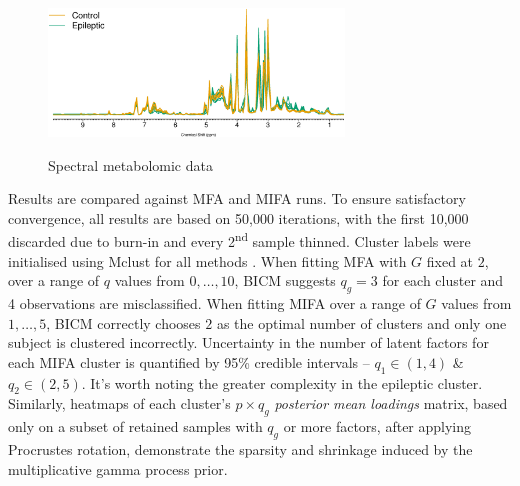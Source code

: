 \documentclass[a4paper,12pt,fleqn]{article}
\numberwithin{equation}{section}
\begin{document}
\begin{figure}[h]
	\centering
	\caption{Spectral metabolomic data}
	\includegraphics[width=0.7\textwidth, keepaspectratio]{Urine_Data.eps}
	\label{RatData}
\end{figure}

Results are compared against MFA and MIFA runs. To ensure satisfactory convergence, all results are based on 50,000 iterations, with the first 10,000 discarded due to burn-in and every 2\textsuperscript{nd} sample thinned. Cluster labels were initialised using Mclust for all methods \citep{Mclust}. When fitting MFA with $G$ fixed at $2$, over a range of $q$ values from $0,\ldots,10$, BICM suggests $q_g = 3$ for each cluster and 4 observations are misclassified. When fitting MIFA over a range of $G$ values from $1, \ldots, 5$, BICM correctly chooses $2$ as the optimal number of clusters and only one subject is clustered incorrectly. Uncertainty in the number of latent factors for each MIFA cluster is quantified by 95\% credible intervals -- $q_1 \in \left(1,4\right)$ \& $q_2 \in \left(2,5\right)$. It's worth noting the greater complexity in the epileptic cluster. Similarly, heatmaps of each cluster's $p\times q_g$ \textit{posterior mean loadings} matrix, based only on a subset of retained samples with $q_g$ or more factors, after applying Procrustes rotation, demonstrate the sparsity and shrinkage induced by the multiplicative gamma process prior.
\end{document}
